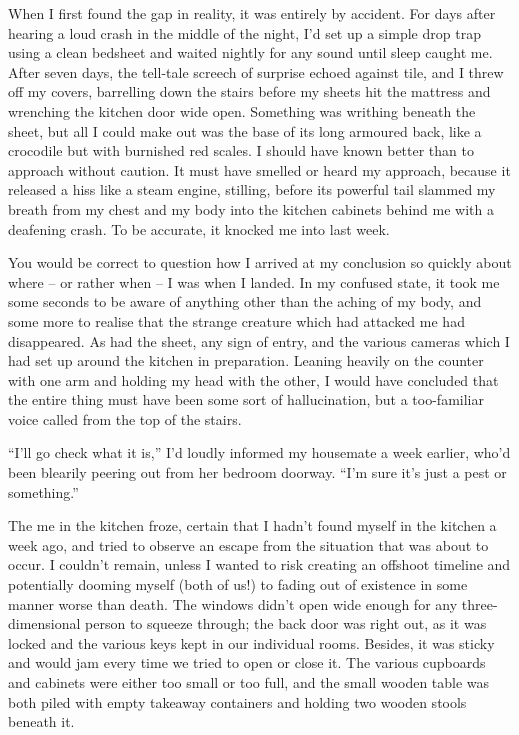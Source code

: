 When I first found the gap in reality, it was entirely by accident. For days after hearing a loud crash in the middle of the night, I'd set up a simple drop trap using a clean bedsheet and waited nightly for any sound until sleep caught me. After seven days, the tell-tale screech of surprise echoed against tile, and I threw off my covers, barrelling down the stairs before my sheets hit the mattress and wrenching the kitchen door wide open. Something was writhing beneath the sheet, but all I could make out was the base of its long armoured back, like a crocodile but with burnished red scales. I should have known better than to approach without caution. It must have smelled or heard my approach, because it released a hiss like a steam engine, stilling, before its powerful tail slammed my breath from my chest and my body into the kitchen cabinets behind me with a deafening crash. To be accurate, it knocked me into last week.

You would be correct to question how I arrived at my conclusion so quickly about where – or rather when – I was when I landed. In my confused state, it took me some seconds to be aware of anything other than the aching of my body, and some more to realise that the strange creature which had attacked me had disappeared. As had the sheet, any sign of entry, and the various cameras which I had set up around the kitchen in preparation. Leaning heavily on the counter with one arm and holding my head with the other, I would have concluded that the entire thing must have been some sort of hallucination, but a too-familiar voice called from the top of the stairs.

``I'll go check what it is,'' I'd loudly informed my housemate a week earlier, who’d been blearily peering out from her bedroom doorway. ``I'm sure it's just a pest or something.''

The me in the kitchen froze, certain that I hadn't found myself in the kitchen a week ago, and tried to observe an escape from the situation that was about to occur. I couldn't remain, unless I wanted to risk creating an offshoot timeline and potentially dooming myself (both of us!) to fading out of existence in some manner worse than death. The windows didn't open wide enough for any three-dimensional person to squeeze through; the back door was right out, as it was locked and the various keys kept in our individual rooms. Besides, it was sticky and would jam every time we tried to open or close it. The various cupboards and cabinets were either too small or too full, and the small wooden table was both piled with empty takeaway containers and holding two wooden stools beneath it.

